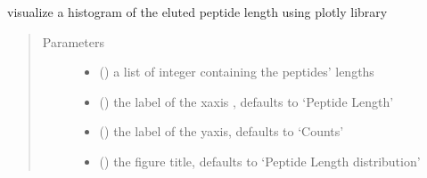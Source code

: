 \documentclass[letterpaper,10pt,english]{sphinxmanual}
\begin{document}
\begin{fulllineitems}
\label{\detokenize{IPTK.Visualization:IPTK.Visualization.vizTools.plotly_peptide_length_dist}}
visualize a histogram of the eluted peptide length using plotly library
\begin{quote}\begin{description}
\item[{Parameters}] \leavevmode\begin{itemize}
\item {} 
 (\sphinxstyleliteralemphasis{\sphinxupquote{{[}}}\sphinxstyleliteralemphasis{\sphinxupquote{{]}}}) \textendash{} a list of integer containing the peptides’ lengths

\item {} 
 (\sphinxstyleliteralemphasis{\sphinxupquote{, }}) \textendash{} the label of the x\sphinxhyphen{}axis , defaults to ‘Peptide Length’

\item {} 
 (\sphinxstyleliteralemphasis{\sphinxupquote{, }}) \textendash{} the label of the y\sphinxhyphen{}axis, defaults to ‘Counts’

\item {} 
 (\sphinxstyleliteralemphasis{\sphinxupquote{, }}) \textendash{} the figure title, defaults to ‘Peptide Length distribution’

\end{itemize}

\end{description}\end{quote}

\end{fulllineitems}
\end{document}
